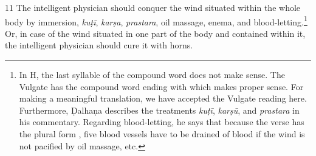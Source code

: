 \begin{translation}
    \item[11]
    The intelligent physician should conquer the wind situated within the whole body by immersion, \textit{kuṭī}, \textit{karṣa}, \textit{prastara}, oil massage, enema, and blood-letting.\footnote{In H, the last syllable  of the compound word does not make sense. The Vulgate has the compound word ending with  which makes proper sense. For making a meaningful translation, we have accepted the Vulgate reading here. Furthermore, Ḍalhaṇa describes the treatments \textit{kuṭī}, \textit{karṣū}, and \textit{prastara} in his commentary. Regarding blood-letting, he says that because the verse has the plural form , five blood vessels have to be drained of blood if the wind is not pacified by oil massage, etc.} Or, in case of the wind situated in one part of the body and contained within it, the intelligent physician should cure it with horns. 
    
\end{translation}
